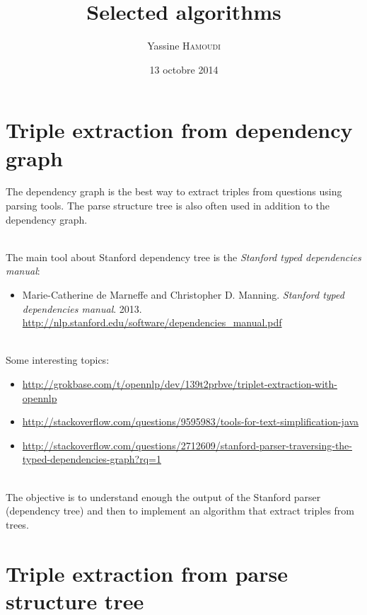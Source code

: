 \documentclass[a4paper,10pt]{article} %
\title{Selected algorithms}
\author{ {\Large Yassine \textsc{Hamoudi}}}
\date{13 octobre 2014}
\begin{document}
\maketitle


\section{Triple extraction from dependency graph}

The dependency graph is the best way to extract triples from questions using parsing tools. The parse structure tree is also often used in addition to the dependency graph.

~\\
The main tool about Stanford dependency tree is the \textit{Stanford typed dependencies manual}:
~\\
\begin{itemize}
	\item[] Marie-Catherine de Marneffe and Christopher D. Manning. \emph{Stanford typed dependencies manual}. 2013. \url{http://nlp.stanford.edu/software/dependencies_manual.pdf}
\end{itemize}


~\\
Some interesting topics:
\begin{itemize}
	\item \url{http://grokbase.com/t/opennlp/dev/139t2prbve/triplet-extraction-with-opennlp}
 	\item \url{http://stackoverflow.com/questions/9595983/tools-for-text-simplification-java}
	\item \sloppy \url{http://stackoverflow.com/questions/2712609/stanford-parser-traversing-the-typed-dependencies-graph?rq=1}
\end{itemize}

~\\
The objective is to understand enough the output of the Stanford parser (dependency tree) and then to implement an algorithm that extract triples from trees.

\section{Triple extraction from parse structure tree}
\end{document}
